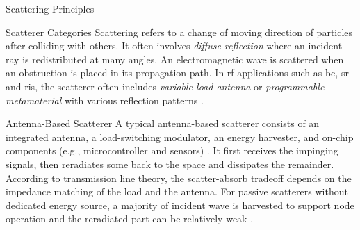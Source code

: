 \documentclass[journal]{IEEEtran}
\begin{document}
\begin{section}{Scattering Principles}
	\begin{figure*}[!t]
		\centering
		\caption{Block diagram, equivalent circuit, and scatter model of a passive backscatter node. The solid and dashed vectors represent signal and energy flows. The backscatter antenna behaves as a constant power source, where the voltage $V_0$ and current $I_0$ are introduced by incident electric field $\vec{E}_{\mathrm{I}}$ and magnetic field $\vec{H}_{\mathrm{I}}$ \cite{Huang2021}.}
	\end{figure*}
	\begin{subsection}{Scatterer Categories}
		Scattering refers to a change of moving direction of particles after colliding with others.
		It often involves \emph{diffuse reflection} where an incident ray is redistributed at many angles.
		An electromagnetic wave is scattered when an obstruction is placed in its propagation path.
		In \gls{rf} applications such as \gls{bc}, \gls{sr} and \gls{ris}, the scatterer often includes \emph{variable-load antenna} or \emph{programmable metamaterial} with various reflection patterns \cite{Liang2022}.
		\begin{subsubsection}{Antenna-Based Scatterer}
			A typical antenna-based scatterer consists of an integrated antenna, a load-switching modulator, an energy harvester, and on-chip components (e.g., microcontroller and sensors) \cite{Dobkin2012}.
			It first receives the impinging signals, then reradiates some back to the space and dissipates the remainder.
			According to transmission line theory, the scatter-absorb tradeoff depends on the impedance matching of the load and the antenna.
			For passive scatterers without dedicated energy source, a majority of incident wave is harvested to support node operation and the reradiated part can be relatively weak \cite{Thomas2012a}.

\end{subsubsection}
\end{subsection}
\end{section}
\end{document}

